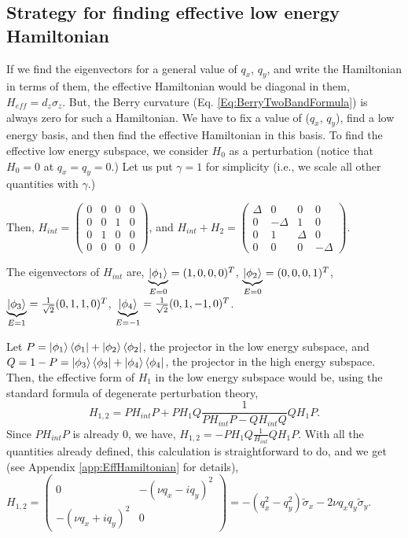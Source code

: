 \documentclass{report}
\begin{document}
\subsection{Strategy for finding effective low energy Hamiltonian}
If we find the eigenvectors for a general value of $q_x$, $q_y$, and write the Hamiltonian in terms of them, the effective Hamiltonian would be diagonal in them, $H_{eff} = d_z \sigma_z$. But, the Berry curvature (Eq. \eqref{Eq:BerryTwoBandFormula}) is always zero for such a Hamiltonian. We have to fix a value of ($q_x$, $q_y$), find a low energy basis, and then find the effective Hamiltonian in this basis.
To find the effective low energy subspace, we consider $H_0$ as a perturbation (notice that $H_0 = 0$ at $q_x = q_y =0$.) Let us put $\gamma = 1$ for simplicity (i.e., we scale all other quantities with $\gamma$.)

Then, $H_{int} = \begin{pmatrix}
	0 & 0 & 0 & 0 \\
	0 & 0 & 1 & 0 \\
	0 & 1 & 0 & 0 \\
	0 & 0 & 0 & 0 
\end{pmatrix}$, and $ H_{int} + H_2 = \begin{pmatrix}
	\Delta & 0 & 0 & 0 \\
	0 & -\Delta & 1 & 0 \\
	0 & 1 & \Delta & 0 \\
	0 & 0 & 0 & -\Delta 
\end{pmatrix} $.

The eigenvectors of $H_{int}$ are, $\underbrace{\ket{\phi_1}}_{E = 0} = (1,0,0,0)^T$, $\underbrace{\ket{\phi_2}}_{E = 0} = (0,0,0,1)^T$,
$\underbrace{\ket{\phi_3}}_{E = 1} = \frac{1}{\sqrt{2}}(0,1,1,0)^T$,
$\underbrace{\ket{\phi_4}}_{E = -1} = \frac{1}{\sqrt{2}}(0,1,-1,0)^T$.

Let $P = \ket{\phi_1}\bra{\phi_1} + \ket{\phi_2}\bra{\phi_2}$, the projector in the low energy subspace, and $Q = 1 - P = \ket{\phi_3}\bra{\phi_3} + \ket{\phi_4}\bra{\phi_4}$, the projector in the high energy subspace.
Then, the effective form of $H_1$ in the low energy subspace would be, using the standard formula of degenerate perturbation theory,
$$H_{1,2} = P H_{int} P + P H_1 Q \frac{1}{P H_{int} P - Q H_{int} Q} Q H_1 P .$$
Since $P H_{int} P$ is already 0, we have, $H_{1,2} =- P H_1 Q \frac{1}{H_{int}} Q H_1 P$. With all the quantities already defined, this calculation is straightforward to do, and we get (see Appendix \ref{app:EffHamiltonian} for details), $H_{1,2} = \begin{pmatrix}
	0 & -(\nu q_x - i q_y)^2\\
	-(\nu q_x + i q_y)^2 & 0
\end{pmatrix} = -(q_x^2 - q_y^2) \tilde{\sigma}_x - 2 \nu q_x q_y \tilde{\sigma}_y$.
\end{document}
